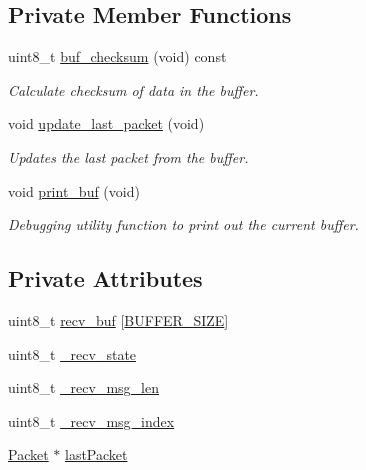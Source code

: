 \subsection*{Private Member Functions}
\begin{DoxyCompactItemize}
\item 
uint8\+\_\+t \hyperlink{class_bluetooth_client_a916ad4b917618bcc23dab0d258fe77d9}{buf\+\_\+checksum} (void) const
\begin{DoxyCompactList}\small\item\em Calculate checksum of data in the buffer. \end{DoxyCompactList}\item 
void \hyperlink{class_bluetooth_client_a52ed2098b5525a6aef38af5af5c74a91}{update\+\_\+last\+\_\+packet} (void)
\begin{DoxyCompactList}\small\item\em Updates the last packet from the buffer. \end{DoxyCompactList}\item 
void \hyperlink{class_bluetooth_client_ab43fcdea20009df8150e096e82a52ae6}{print\+\_\+buf} (void)
\begin{DoxyCompactList}\small\item\em Debugging utility function to print out the current buffer. \end{DoxyCompactList}\end{DoxyCompactItemize}
\subsection*{Private Attributes}
\begin{DoxyCompactItemize}
\item 
uint8\+\_\+t \hyperlink{class_bluetooth_client_a83675b45ddf8021663ecd6200a22b1cb}{recv\+\_\+buf} \mbox{[}\hyperlink{class_bluetooth_client_a88edb272fc00fb3c65b9e95281cae00b}{B\+U\+F\+F\+E\+R\+\_\+\+S\+I\+ZE}\mbox{]}
\item 
uint8\+\_\+t \hyperlink{class_bluetooth_client_a84f2227913ec4eaf68fe3ccfaaf29d9e}{\+\_\+recv\+\_\+state}
\item 
uint8\+\_\+t \hyperlink{class_bluetooth_client_a30e47aa21808bd60b99cf5778e67c059}{\+\_\+recv\+\_\+msg\+\_\+len}
\item 
uint8\+\_\+t \hyperlink{class_bluetooth_client_a0edb43a0aa23b2b4a9f5a1b94d568ed0}{\+\_\+recv\+\_\+msg\+\_\+index}
\item 
\hyperlink{class_packet}{Packet} $\ast$ \hyperlink{class_bluetooth_client_aedcb6766e3a877b5e468ed1347caf483}{last\+Packet}
\end{DoxyCompactItemize}
